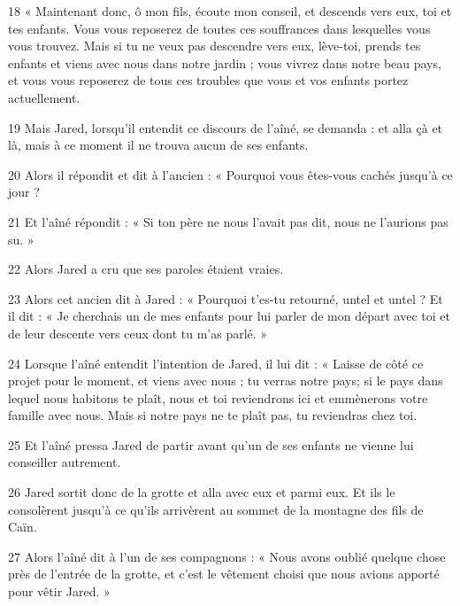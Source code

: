 \par 18 « Maintenant donc, ô mon fils, écoute mon conseil, et descends vers eux, toi et tes enfants. Vous vous reposerez de toutes ces souffrances dans lesquelles vous vous trouvez. Mais si tu ne veux pas descendre vers eux, lève-toi, prends tes enfants et viens avec nous dans notre jardin ; vous vivrez dans notre beau pays, et vous vous reposerez de tous ces troubles que vous et vos enfants portez actuellement.

\par 19 Mais Jared, lorsqu'il entendit ce discours de l'aîné, se demanda : et alla çà et là, mais à ce moment il ne trouva aucun de ses enfants.

\par 20 Alors il répondit et dit à l'ancien : « Pourquoi vous êtes-vous cachés jusqu'à ce jour ?

\par 21 Et l'aîné répondit : « Si ton père ne nous l'avait pas dit, nous ne l'aurions pas su. »

\par 22 Alors Jared a cru que ses paroles étaient vraies.

\par 23 Alors cet ancien dit à Jared : « Pourquoi t'es-tu retourné, untel et untel ? Et il dit : « Je cherchais un de mes enfants pour lui parler de mon départ avec toi et de leur descente vers ceux dont tu m'as parlé. »

\par 24 Lorsque l'aîné entendit l'intention de Jared, il lui dit : « Laisse de côté ce projet pour le moment, et viens avec nous ; tu verras notre pays; si le pays dans lequel nous habitons te plaît, nous et toi reviendrons ici et emmènerons votre famille avec nous. Mais si notre pays ne te plaît pas, tu reviendras chez toi.

\par 25 Et l'aîné pressa Jared de partir avant qu'un de ses enfants ne vienne lui conseiller autrement.

\par 26 Jared sortit donc de la grotte et alla avec eux et parmi eux. Et ils le consolèrent jusqu'à ce qu'ils arrivèrent au sommet de la montagne des fils de Caïn.

\par 27 Alors l'aîné dit à l'un de ses compagnons : « Nous avons oublié quelque chose près de l'entrée de la grotte, et c'est le vêtement choisi que nous avions apporté pour vêtir Jared. »

